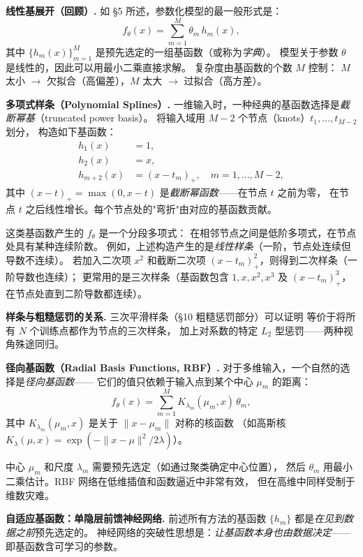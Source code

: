 \textbf{线性基展开（回顾）.}
如 §5 所述，参数化模型的最一般形式是：
\begin{equation}\label{eq:basis-expansion-2}
    f_\theta(x) = \sum_{m=1}^{M} \theta_m \, h_m(x),
\end{equation}
其中 $\{h_m(x)\}_{m=1}^M$ 是预先选定的一组基函数（或称为\emph{字典}）。
模型关于参数 $\theta$ 是线性的，因此可以用最小二乘直接求解。
复杂度由基函数的个数 $M$ 控制：
$M$ 太小 $\to$ 欠拟合（高偏差），$M$ 太大 $\to$ 过拟合（高方差）。

\medskip
\textbf{多项式样条（Polynomial Splines）.}
一维输入时，一种经典的基函数选择是\emph{截断幂基}（truncated power basis）。
将输入域用 $M-2$ 个节点（knots）$t_1, \dots, t_{M-2}$ 划分，
构造如下基函数：
\begin{align}
    h_1(x) &= 1, \nonumber\\
    h_2(x) &= x, \nonumber\\
    h_{m+2}(x) &= (x - t_m)_{+}, \quad m = 1, \dots, M-2,
\end{align}
其中 $(x - t)_+ = \max(0, x - t)$ 是\emph{截断幂函数}——在节点 $t$ 之前为零，
在节点 $t$ 之后线性增长。每个节点处的"弯折"由对应的基函数贡献。

这类基函数产生的 $f_\theta$ 是一个分段多项式：
在相邻节点之间是低阶多项式，在节点处具有某种连续阶数。
例如，上述构造产生的是\emph{线性样条}（一阶，节点处连续但导数不连续）。
若加入二次项 $x^2$ 和截断二次项 $(x-t_m)_+^2$，则得到二次样条（一阶导数也连续）；
更常用的是三次样条（基函数包含 $1, x, x^2, x^3$ 及 $(x-t_m)_+^3$，
在节点处直到二阶导数都连续）。

\textbf{样条与粗糙惩罚的关系.} 三次平滑样条（§10 粗糙惩罚部分）可以证明
等价于将所有 $N$ 个训练点都作为节点的三次样条，
加上对系数的特定 $L_2$ 型惩罚——两种视角殊途同归。

\medskip
\textbf{径向基函数（Radial Basis Functions, RBF）.}
对于多维输入，一个自然的选择是\emph{径向基函数}——
它们的值只依赖于输入点到某个中心 $\mu_m$ 的距离：
\begin{equation}\label{eq:rbf}
    f_\theta(x) = \sum_{m=1}^{M} K_{\lambda_m}(\mu_m, x) \, \theta_m,
\end{equation}
其中 $K_{\lambda_m}(\mu_m, x)$ 是关于 $\|x - \mu_m\|$ 对称的核函数
（如高斯核 $K_\lambda(\mu, x) = \exp(-\|x-\mu\|^2 / 2\lambda)$）。

中心 $\mu_m$ 和尺度 $\lambda_m$ 需要预先选定（如通过聚类确定中心位置），
然后 $\theta_m$ 用最小二乘估计。RBF 网络在低维插值和函数逼近中非常有效，
但在高维中同样受制于维数灾难。

\medskip
\textbf{自适应基函数：单隐层前馈神经网络.}
前述所有方法的基函数 $\{h_m\}$ 都是\emph{在见到数据之前}预先选定的。
神经网络的突破性思想是：\emph{让基函数本身也由数据决定}——即基函数含可学习的参数。

